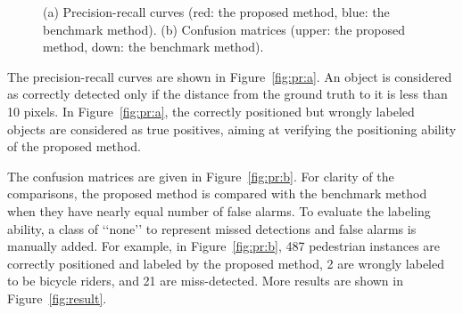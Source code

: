 \begin{figure}
{\begin{minipage}[b]{0.47\textwidth}
\end{minipage}
\label{fig:pr:b}}
\caption[Comparisons with benchmark method]{(a) Precision-recall curves (red: the proposed method, blue: the benchmark method). (b) Confusion matrices (upper: the proposed method, down: the benchmark method).}
\label{fig:pr}
\end{figure}

The precision-recall curves are shown in Figure~\ref{fig:pr:a}. An object is considered as correctly detected only if the distance from the ground truth to it is less than 10 pixels. In Figure~\ref{fig:pr:a}, the correctly positioned but wrongly labeled objects are considered as true positives, aiming at verifying the positioning ability of the proposed method.

The confusion matrices are given in Figure~\ref{fig:pr:b}. For clarity of the comparisons, the proposed method is compared with the benchmark method when they have nearly equal number of false alarms. To evaluate the labeling ability, a class of {\lq\lq}none{\rq\rq} to represent missed detections and false alarms is manually added. For example, in Figure~\ref{fig:pr:b}, 487 pedestrian instances are correctly positioned and labeled by the proposed method, 2 are wrongly labeled to be bicycle riders, and 21 are miss-detected. More results are shown in Figure~\ref{fig:result}.

